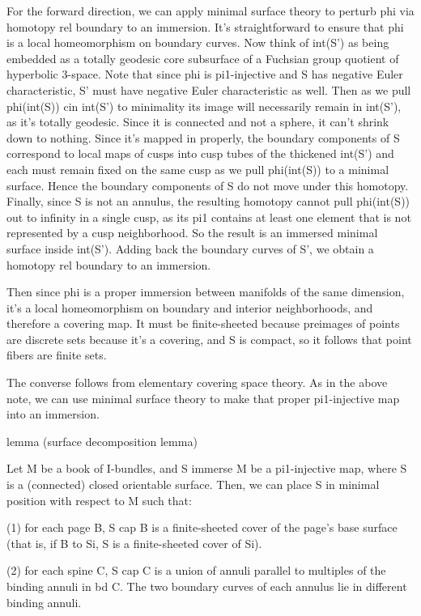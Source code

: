 For the forward direction, we can apply minimal surface theory to perturb phi
via homotopy rel boundary to an immersion. It's straightforward to ensure that
phi is a local homeomorphism on boundary curves. Now think of int(S') as being
embedded as a totally geodesic core subsurface of a Fuchsian group quotient of
hyperbolic 3-space. Note that since phi is pi1-injective and S has negative
Euler characteristic, S' must have negative Euler characteristic as well. Then
as we pull phi(int(S)) cin int(S') to minimality its image will necessarily
remain in int(S'), as it's totally geodesic.  Since it is connected and not
a sphere, it can't shrink down to nothing. Since it's mapped in properly, the
boundary components of S correspond to local maps of cusps into cusp tubes of
the thickened int(S') and each must remain fixed on the same cusp as we pull
phi(int(S)) to a minimal surface.  Hence the boundary components of S do not
move under this homotopy.  Finally, since S is not an annulus, the resulting
homotopy cannot pull phi(int(S)) out to infinity in a single cusp, as its pi1
contains at least one element that is not represented by a cusp neighborhood.
So the result is an immersed minimal surface inside int(S'). Adding back the
boundary curves of S', we obtain a homotopy rel boundary to an immersion.

Then since phi is a proper immersion between manifolds of the same dimension,
it's a local homeomorphism on boundary and interior neighborhoods, and
therefore a covering map. It must be finite-sheeted because preimages of points
are discrete sets because it's a covering, and S is compact, so it follows that
point fibers are finite sets.

The converse follows from elementary covering space theory. As in the above
note, we can use minimal surface theory to make that proper pi1-injective map
into an immersion.

lemma (surface decomposition lemma)

Let M be a book of I-bundles, and S immerse M be a pi1-injective map, where
S is a (connected) closed orientable surface.  Then, we can place S in minimal
position with respect to M such that:

(1) for each page B, S cap B is a finite-sheeted cover of the page's base
surface (that is, if B to Si, S is a finite-sheeted cover of Si).

(2) for each spine C, S cap C is a union of annuli parallel to multiples of the
binding annuli in bd C. The two boundary curves of each annulus lie in
different binding annuli.

